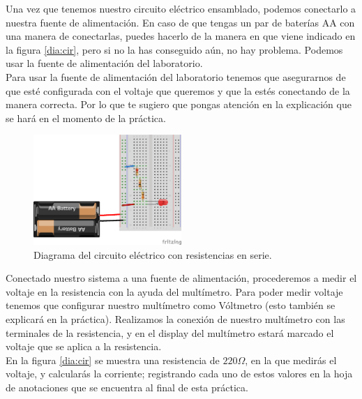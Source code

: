     Una vez que tenemos nuestro circuito eléctrico ensamblado, podemos conectarlo a nuestra fuente de alimentación. En caso de que tengas un par de baterías AA con una manera de conectarlas, puedes hacerlo de la manera en que viene indicado en la figura \ref{dia:cir}, pero si no la has conseguido aún, no hay problema. Podemos usar la fuente de alimentación del laboratorio. \\

    Para usar la fuente de alimentación del laboratorio tenemos que asegurarnos de que esté configurada con el voltaje que queremos y que la estés conectando de la manera correcta. Por lo que te sugiero que pongas atención en la explicación que se hará en el momento de la práctica. \\

    \begin{figure}[h]
    	\begin{center}
    		\includegraphics[width=0.5\textwidth]{images/LED-bateria-resistencias.png}
    		\caption{Diagrama del circuito eléctrico con resistencias en serie.}
    		\label{dia:serie}
    	\end{center}
    \end{figure}

    Conectado nuestro sistema a una fuente de alimentación, procederemos a medir el voltaje en la resistencia con la ayuda del multímetro. Para poder medir voltaje tenemos que configurar nuestro multímetro como Vóltmetro (esto también se explicará en la práctica). Realizamos la conexión de nuestro multímetro con las terminales de la resistencia, y en el display del multímetro estará marcado el voltaje que se aplica a la resistencia. \\

    En la figura \ref{dia:cir} se muestra una resistencia de $220 \Omega$, en la que medirás el voltaje, y calcularás la corriente; registrando cada uno de estos valores en la hoja de anotaciones que se encuentra al final de esta práctica. \\

